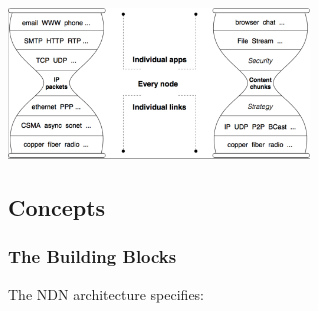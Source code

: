             \begin{center}\includegraphics[width=0.6\textwidth]{media/ndn_hourglass2.png}\end{center}

        \subsection{Concepts}
            \subsubsection{The Building Blocks}
                The NDN architecture specifies:
